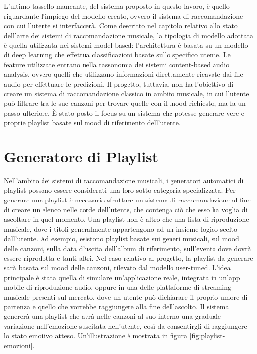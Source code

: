 \documentclass[11pt]{report}
\begin{document}
L'ultimo tassello mancante, del sistema proposto in questo lavoro, è quello riguardante l'impiego del modello creato, ovvero il sistema di raccomandazione con cui l'utente si interfaccerà. Come descritto nel capitolo relativo allo stato dell'arte dei sistemi di raccomandazione musicale, la tipologia di modello adottata è quella utilizzata nei sistemi model-based: l'architettura è basata su un modello di deep learning che effettua classificazioni basate sullo specifico utente. Le feature utilizzate entrano nella tassonomia dei sistemi content-based audio analysis, ovvero quelli che utilizzano informazioni direttamente ricavate dai file audio per effettuare le predizioni. Il progetto, tuttavia, non ha l'obiettivo di creare un sistema di raccomandazione classico in ambito musicale, in cui l'utente può filtrare tra le sue canzoni per trovare quelle con il mood richiesto, ma fa un passo ulteriore. È stato posto il focus su un sistema che potesse generare vere e proprie playlist basate sul mood di riferimento dell'utente. 


\section{Generatore di Playlist}


Nell'ambito dei sistemi di raccomandazione musicali, i generatori automatici di playlist possono essere considerati una loro sotto-categoria specializzata. Per generare una playlist è necessario sfruttare un sistema di raccomandazione al fine di creare un elenco nelle corde dell'utente, che contenga ciò che esso ha voglia di ascoltare in quel momento. Una playlist non è altro che una lista di riproduzione musicale, dove i titoli generalmente appartengono ad un insieme logico scelto dall'utente. Ad esempio, esistono playlist basate sui generi musicali, sul mood delle canzoni, sulla data d'uscita dell'album di riferimento, sull'evento dove dovrà essere riprodotta e tanti altri. Nel caso relativo al progetto, la playlist da generare sarà basata sul mood delle canzoni, rilevato dal modello user-tuned. L'idea principale è stata quella di simulare un'applicazione reale, integrata in un'app mobile di riproduzione audio, oppure in una delle piattaforme di streaming musicale presenti sul mercato, dove un utente può dichiarare il proprio umore di partenza e quello che vorrebbe raggiungere alla fine dell'ascolto. Il sistema genererà una playlist che avrà nelle canzoni al suo interno una graduale variazione nell'emozione suscitata nell'utente, così da consentirgli di raggiungere lo stato emotivo atteso. Un'illustrazione è mostrata in figura \ref{fig:playlist-emozioni}.
\end{document}
